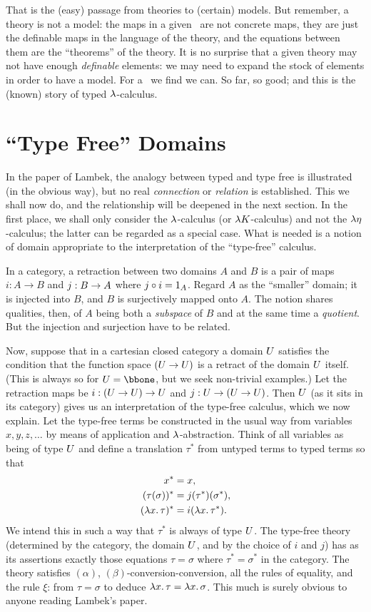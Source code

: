 That is the (easy) passage from theories to (certain) models.
But remember, a theory is not a model: the maps in a given
\ccc\ are not concrete maps, they are just the definable maps in the language of the theory, and the equations between them are the ``theorems'' of the theory. It is no surprise that a given theory may not have enough {\it definable} elements: we may need to expand the stock of elements in order to have a model. For a \ccc\ we find we can. So far, so good; and this is the (known) story of typed $\lambda$-calculus.

\section{``Type Free'' Domains}

In the paper of Lambek, the analogy between typed and type free is illustrated (in the obvious way), but no real {\it connection} or {\it relation} is established. This we shall now do, and the relationship will be deepened in the next section.
In the first place, we shall only consider the $\lambda$-calculus (or $\lambda K$-calculus) and not the $\lambda \eta$-calculus; the latter can be regarded as a special case. What is needed is a notion of domain appropriate to the interpretation of the ``type-free'' calculus.

In a category, a retraction between two domains $A$ and $B$ is a pair of maps $i: A\to B$ and $j : B \rightarrow A$ where $j \circ i = {\mathrm 1}_A$. Regard $A$ as the ``smaller'' domain; it is injected into $B$, and $B$ is surjectively mapped onto $A$. The notion shares qualities, then, of $A$ being both a {\it subspace} of $B$ and at the same time a {\it quotient}.
But the injection and surjection have to be related.

Now, suppose that in a cartesian closed category a domain $U$ satisfies the condition that the function space $(U\rightarrow U)$ is a retract of the domain $U$ itself. (This is always so for $\U = \bbone$, but we seek non-trivial examples.) Let the retraction maps be $i: (U \rightarrow U) \rightarrow U$ and $j : U \rightarrow (U \rightarrow U)$. Then $U$ (as it sits in its category) gives us an interpretation of the type-free calculus, which we now explain.
Let the type-free terms be constructed in the usual way from variables $x,y,z, \dots$ by means of application and $\lambda$-abstraction.
Think of all variables as being of type $U$ and define a translation $\tau^*$ from untyped terms to typed terms so that
\begin{align*}
x^* &= x, \\
(\tau(\sigma))^* &= j(\tau^*)(\sigma^*),\\
(\lm{x}.\tau)^* &= i(\lm{x}.\tau^*).
\end{align*}
We intend this in such a way that $\tau^*$ is always of type $U$. The type-free theory (determined by the category, the domain $U$, and by the choice of $i$ and $j$) has as its assertions exactly those equations $\tau = \sigma$ where $\tau^* = \sigma^*$ in the category. The theory satisfies $(\alpha)$, $(\beta)$-conversion-conversion, all the rules of equality, and the rule $\xi$: from $\tau = \sigma$ to deduce $\lambda x .\, \tau = \lambda x .\, \sigma$. This much is surely obvious to anyone reading Lambek's paper.

